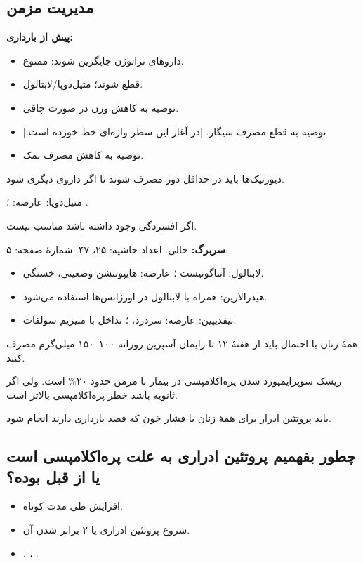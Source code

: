 \documentclass[12pt,a4paper]{article}
\begin{document}
\subsection*{مدیریت  مزمن}
\textbf{پیش از بارداری:}
\begin{itemize}
\item داروهای تراتوژن جایگزین شوند:  ممنوع.
\item {} قطع شوند؛ متیل‌دوپا/لابتالول.
\item توصیه به کاهش وزن در صورت چاقی.
\item توصیه به قطع مصرف سیگار. [در آغاز این سطر واژه‌ای خط خورده است.]
\item توصیه به کاهش مصرف نمک.
\end{itemize}
دیورتیک‌ها باید در حداقل دوز مصرف شوند تا اگر داروی دیگری  شود. 

متیل‌دوپا: عارضه: ؛ .

اگر  افسردگی وجود داشته باشد مناسب نیست.

\textbf{سربرگ:}  خالی. اعداد حاشیه: ۲۵، ۴۷. شمارهٔ صفحه: ۵.
\begin{itemize}
\item لابتالول: آنتاگونیست \HTNm{\alpha,\beta}؛ عارضه: هایپوتنشن وضعیتی، خستگی.
\item هیدرالازین: همراه با لابتالول در اورژانس‌ها استفاده می‌شود.
\item نیفدیپین: عارضه: سردرد، ؛ تداخل با منیزیم سولفات.
\end{itemize}
همهٔ زنان با احتمال  باید از هفتهٔ ۱۲ تا زایمان آسپرین روزانه ۱۰۰--۱۵۰ میلی‌گرم مصرف کنند.

ریسک سوپرایمپوزد شدن پره‌اکلامپسی در بیمار با  مزمن حدود ۲۰\% است.
ولی اگر  ثانویه باشد خطر پره‌اکلامپسی بالاتر است.

باید پروتئین ادرار  برای همهٔ زنان با فشار خون که قصد بارداری دارند انجام شود.
\subsection*{چطور بفهمیم پروتئین ادراری به علت پره‌اکلامپسی است یا از قبل بوده؟}
\begin{itemize}
\item افزایش  طی مدت کوتاه.
\item شروع پروتئین ادراری یا ۲ برابر شدن آن.
\item {}، ، .
\end{itemize}
\end{document}

